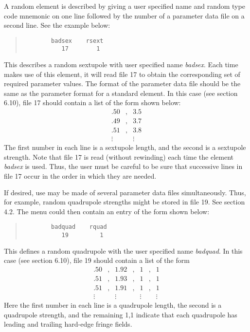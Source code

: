          A random element is described by giving a user specified name and
random type code mnemonic on one line followed by the number of a parameter
data file on a second line.  See the example below:
\begin{quotation}
\begin{verbatim}
        badsex    rsext
           17        1
\end{verbatim}
\end{quotation}
This describes a random sextupole with user specified name {\em badsex}.  Each
time \Mary makes use of this element, it will read file 17 to obtain the
corresponding set of required parameter values.  The format of the
parameter data file should be the same as the parameter format for a
standard element. In this case (see section 6.10), file 17 should contain a
list of the form shown below:
\[\begin{array}{ccc}
         .50 & , & 3.5 \\
         .49 & , & 3.7 \\
         .51 & , & 3.8 \\
      \vdots &   & \vdots
\end{array}\]
The first number in each line is a sextupole length, and the second is a
sextupole strength.  Note that file 17 is read (without rewinding) each
time the element {\em badsex } is used.  Thus, the user must be careful to be sure
that successive lines in file 17 occur in the order in which they are
needed.

         If desired, use may be made of several parameter data files
simultaneously.  Thus, for example, random quadrupole strengths might be
stored in file 19.  See section 4.2.  The menu could then contain an entry
of the form shown below:
\begin{quotation}
\begin{verbatim}
        badquad    rquad
           19         1
\end{verbatim}
\end{quotation}
This defines a random quadrupole with the user specified name {\em badquad}.  In
this case (see section 6.10), file 19 should contain a list of the form
\[\begin{array}{ccccccc}
         .50 & , & 1.92 & , & 1 & , & 1 \\
         .51 & , & 1.93 & , & 1 & , & 1 \\
         .51 & , & 1.91 & , & 1 & , & 1 \\
\vdots & & \vdots & & \vdots & & \vdots
\end{array}\]
Here the first number in each line is a quadrupole length, the second is a
quadrupole strength, and the remaining 1,1 indicate that each quadrupole
has leading and trailing hard-edge fringe fields.

